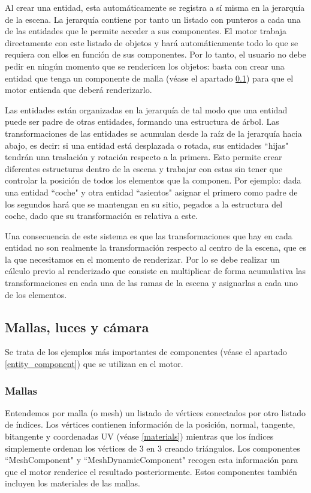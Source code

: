 Al crear una entidad, esta automáticamente se registra a sí misma en la jerarquía de la escena. La jerarquía contiene por tanto un listado con punteros a cada una de las entidades que le permite acceder a sus componentes. El motor trabaja directamente con este listado de objetos y hará automáticamente todo lo que se requiera con ellos en función de sus componentes. Por lo tanto, el usuario no debe pedir en ningún momento que se rendericen los objetos: basta con crear una entidad que tenga un componente de malla (véase el apartado \ref{mesh_light_cam}) para que el motor entienda que deberá renderizarlo.

Las entidades están organizadas en la jerarquía de tal modo que una entidad puede ser padre de otras entidades, formando una estructura de árbol. Las transformaciones de las entidades se acumulan desde la raíz de la jerarquía hacia abajo, es decir: si una entidad está desplazada o rotada, sus entidades ``hijas" tendrán una traslación y rotación respecto a la primera. Esto permite crear diferentes estructuras dentro de la escena y trabajar con estas sin tener que controlar la posición de todos los elementos que la componen. Por ejemplo: dada una entidad ``coche" y otra entidad ``asientos" asignar el primero como padre de los segundos hará que se mantengan en su sitio, pegados a la estructura del coche, dado que su transformación es relativa a este.

Una consecuencia de este sistema es que las transformaciones que hay en cada entidad no son realmente la transformación respecto al centro de la escena, que es la que necesitamos en el momento de renderizar. Por lo se debe realizar un cálculo previo al renderizado que consiste en multiplicar de forma acumulativa las transformaciones en cada una de las ramas de la escena y asignarlas a cada uno de los elementos.

\subsection{Mallas, luces y cámara}
\label{mesh_light_cam}
Se trata de los ejemplos más importantes de componentes (véase el apartado \ref{entity_component}) que se utilizan en el motor.

\subsubsection{Mallas}
Entendemos por malla (o mesh) un listado de vértices conectados por otro listado de índices. Los vértices contienen información de la posición, normal, tangente, bitangente y coordenadas UV (véase \ref{materials}) mientras que los índices simplemente ordenan los vértices de 3 en 3 creando triángulos. Los componentes ``MeshComponent" y ``MeshDynamicComponent" recogen esta información para que el motor renderice el resultado posteriormente. Estos componentes también incluyen los materiales de las mallas.

